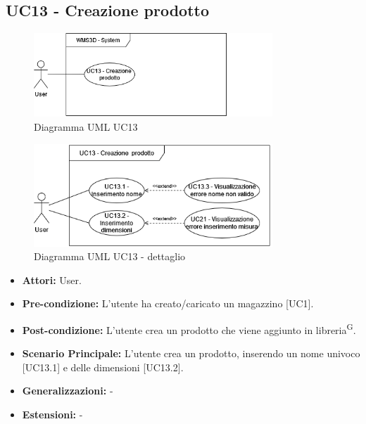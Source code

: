 \subsection{UC13 - Creazione prodotto}
\begin{figure}[H]
  \centering
  \includegraphics[width=0.8\textwidth]{UC_diagrams_11-20/UC13_sys.drawio.png}
   \caption{Diagramma UML UC13}
\end{figure}
\begin{figure}[H]
  \centering
  \includegraphics[width=0.8\textwidth]{UC_diagrams_11-20/UC13.drawio.png}
   \caption{Diagramma UML UC13 - dettaglio}
\end{figure}
\begin{itemize}
    \item \textbf{Attori:} User.
    \item \textbf{Pre-condizione:}  L'utente ha creato/caricato un magazzino [UC1].
    \item \textbf{Post-condizione:} L'utente crea un prodotto che viene aggiunto in libreria\textsuperscript{G}.
    \item \textbf{Scenario Principale:}  L'utente crea un prodotto, inserendo un nome univoco [UC13.1] e delle dimensioni [UC13.2].
    \item \textbf{Generalizzazioni:} -
    \item \textbf{Estensioni:} -
\end{itemize}


